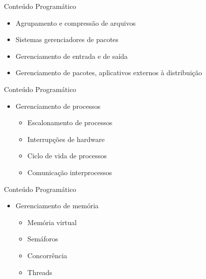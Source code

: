 \documentclass{beamer}
\begin{document}
\begin{frame}{Conteúdo Programático}
      \begin{itemize}
          \item Agrupamento e compressão de arquivos
          \item Sistemas gerenciadores de pacotes
          \item Gerenciamento de entrada e de saída
          \item Gerenciamento de pacotes, aplicativos externos à distribuição
          
      \end{itemize}
  \end{frame}

  \begin{frame}{Conteúdo Programático}
      \begin{itemize}
         
          \item Gerenciamento de processos
              \begin{itemize}
                  \item Escalonamento de processos
                  \item Interrupções de hardware
                  \item Ciclo de vida de processos
                  \item Comunicação interprocessos
              \end{itemize}
          
      \end{itemize}
  \end{frame}
  
  \begin{frame}{Conteúdo Programático}
      \begin{itemize}
          
          \item Gerenciamento de memória
              \begin{itemize}
                  \item Memória virtual
                  \item Semáforos
                  \item Concorrência
                  \item Threads
              \end{itemize}
          
      \end{itemize}
  \end{frame}
\end{document}
